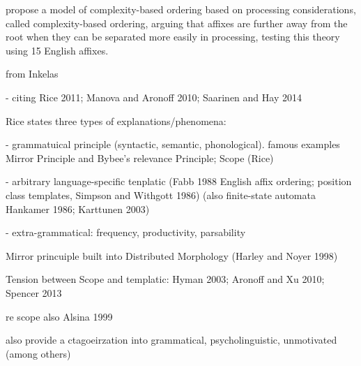 \documentclass[11pt,letterpaper]{article}
\newcommand{\citet}{\Textcite}
\begin{document}
\citet{hay2004what} propose a model of complexity-based ordering based on processing considerations, called complexity-based ordering, arguing that affixes are further away from the root when they can be separated more easily in processing, testing this theory using 15 English affixes.


from Inkelas

- citing Rice 2011; Manova and Aronoff 2010; Saarinen and Hay 2014

Rice states three types of explanations/phenomena:

- grammatuical principle (syntactic, semantic, phonological). famous examples Mirror Principle and Bybee's relevance Principle; Scope (Rice)

- arbitrary language-specific tenplatic (Fabb 1988 English affix ordering; position class templates, Simpson and Withgott 1986) (also finite-state automata Hankamer 1986; Karttunen 2003) \cite{fabb1988english}

- extra-grammatical: frequency, productivity, parsability

Mirror princuiple built into Distributed Morphology (Harley and Noyer 1998)

Tension between Scope and templatic: Hyman 2003; Aronoff and Xu 2010; Spencer 2013

re scope also Alsina 1999

\cite{manova2010modeling} %
%
also provide a ctagoeirzation into grammatical, psycholinguistic, unmotivated (among others)

\cite{aronoff2010introduction}

\cite{spencer2003putting}

\cite{alsina1999where}

\cite{aronoff2010a} %




\cite{plag2009suffix} %
\end{document}
